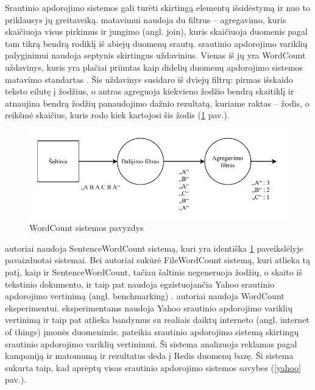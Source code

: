 \documentclass{VUMIFPSbakalaurinis}
\begin{document}
Srautinio apdorojimo sistemos gali turėti skirtingą elementų išsidėstymą ir nuo to priklausys jų greitaveiką. \cite{Karimov2018BenchmarkingDS} matavimui naudoja du filtrus – agregavimo, kuris skaičiuoja visus pirkimus ir jungimo (angl. join), kuris skaičiuoja duomenis pagal tam tikrą bendrą rodiklį iš abiejų duomenų srautų. \cite{Qian2016Benchmarking} srautinio apdorojimo variklių palyginimui naudoja septynis skirtingus uždavinius. Vienas iš jų yra WordCount uždavinys, kuris yra plačiai priimtas kaip didelių duomenų apdorojimo sistemos matavimo standartas \cite{huang2010hibench}. Šis uždavinys susidaro iš dviejų filtrų: pirmas išskaido teksto eilutę į žodžius, o antras agreguoja kiekvieno žodžio bendrą skaitiklį ir atnaujina bendrą žodžių panaudojimo dažnio rezultatą, kuriame raktas – žodis, o reikšmė skaičius, kuris rodo kiek kartojosi šis žodis (\ref{wordcount} pav.). 
\begin{figure}[H]
    \includegraphics[width=15cm]{img/wordcount.pdf}
    \caption{WordCount sistemos pavyzdys}
    \label{wordcount}
\end{figure} 
\cite{zhang2020heron} autoriai naudoja SentenceWordCount sistemą, kuri yra identiška \ref{wordcount} paveikslėlyje pavaizduotai sistemai. Bei autoriai sukūrė FileWordCount sistemą, kuri atlieka tą patį, kaip ir SentenceWordCount, tačiau šaltinis negeneruoja žodžių, o skaito iš tekstinio dokumento, ir taip pat naudoja egzistuojančia Yahoo srautinio apdorojimo vertinimą (angl. benchmarking) \cite{Chintapalli2016Benchmarking}. \cite{dhalion} autoriai naudoja WordCount eksperimentui. \cite{vaquero2018autotuning} eksperimentams naudoja Yahoo srautinio apdorojimo variklių vertinimą \cite{Chintapalli2016Benchmarking} ir taip pat atlieka bandymus su realiais daiktų interneto (angl. internet of things) įmonės duomenimis. \cite{Chintapalli2016Benchmarking} pateikia srautinio apdorojimo sistemą skirtingų srautinio apdorojimo variklių vertinimui. Ši sistema analizuoja reklamas pagal kampaniją ir matomumą ir rezultatus deda į Redis duomenų bazę. Ši sistema sukurta taip, kad aprėptų visas srautinio apdorojimo sistemos savybes (\ref{yahoo} pav.).
\end{document}
